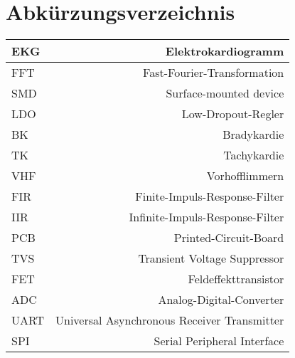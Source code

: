 
\section{Abkürzungsverzeichnis} 

\begin{tabular}[]{l|r}
EKG & Elektrokardiogramm 
\\
\hline
FFT & Fast-Fourier-Transformation 
\\
\hline
SMD & Surface-mounted device 
\\
\hline
LDO & Low-Dropout-Regler 
\\
\hline
BK & Bradykardie 
\\
\hline
TK & Tachykardie
\\
\hline
VHF & Vorhofflimmern
\\
\hline
FIR & Finite-Impuls-Response-Filter
\\
\hline
IIR & Infinite-Impuls-Response-Filter
\\
\hline
PCB & Printed-Circuit-Board
\\
\hline
TVS & Transient Voltage Suppressor
\\
\hline
FET & Feldeffekttransistor
\\
\hline
ADC & Analog-Digital-Converter
\\
\hline
UART & Universal Asynchronous Receiver Transmitter
\\
\hline
SPI & Serial Peripheral Interface

\end{tabular}

